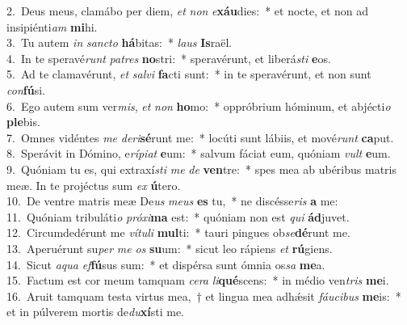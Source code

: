 {2.~}Deus meus, clamábo per diem, \textit{et} \textit{non} \textit{e}\textbf{xáu}dies:~* et nocte, et non ad insipiénti\textit{am} \textbf{mi}hi.\\
{3.~}Tu autem \textit{in} \textit{san}\textit{cto} \textbf{há}bitas:~* \textit{laus} \textbf{Is}raël.\\
{4.~}In te speravé\textit{runt} \textit{pa}\textit{tres} \textbf{no}stri:~* speravérunt, et liberá\textit{sti} \textbf{e}os.\\
{5.~}Ad te clamavérunt, \textit{et} \textit{sal}\textit{vi} \textbf{fa}cti sunt:~* in te speravérunt, et non sunt \textit{con}\textbf{fú}si.\\
{6.~}Ego autem sum ver\textit{mis}, \textit{et} \textit{non} \textbf{ho}mo:~* oppróbrium hóminum, et abjécti\textit{o} \textbf{ple}bis.\\
{7.~}Omnes vidéntes \textit{me} \textit{de}\textit{ri}\textbf{sé}runt me:~* locúti sunt lábiis, et mové\textit{runt} \textbf{ca}put.\\
{8.~}Sperávit in Dómino, e\textit{rí}\textit{pi}\textit{at} \textbf{e}um:~* salvum fáciat eum, quóniam \textit{vult} \textbf{e}um.\\
{9.~}Quóniam tu es, qui extraxí\textit{sti} \textit{me} \textit{de} \textbf{ven}tre:~* spes mea ab ubéribus matris meæ. In te projéctus sum \textit{ex} \textbf{ú}tero.\\
{10.~}De ventre matris meæ De\textit{us} \textit{me}\textit{us} \textbf{es} tu,~* ne discésse\textit{ris} \textbf{a} me:\\
{11.~}Quóniam tribuláti\textit{o} \textit{pró}\textit{xi}\textbf{ma} est:~* quóniam non est \textit{qui} \textbf{ád}juvet.\\
{12.~}Circumdedérunt me \textit{ví}\textit{tu}\textit{li} \textbf{mul}ti:~* tauri pingues ob\textit{se}\textbf{dé}runt me.\\
{13.~}Aperuérunt su\textit{per} \textit{me} \textit{os} \textbf{su}um:~* sicut leo rápiens \textit{et} \textbf{rú}giens.\\
{14.~}Sicut \textit{a}\textit{qua} \textit{ef}\textbf{fú}sus sum:~* et dispérsa sunt ómnia os\textit{sa} \textbf{me}a.\\
{15.~}Factum est cor meum tamquam \textit{ce}\textit{ra} \textit{li}\textbf{qué}scens:~* in médio ven\textit{tris} \textbf{me}i.\\
{16.~}Aruit tamquam testa virtus mea,~† et lingua mea adhǽsit \textit{fáu}\textit{ci}\textit{bus} \textbf{me}is:~* et in púlverem mortis de\textit{du}\textbf{xí}sti me.\\

